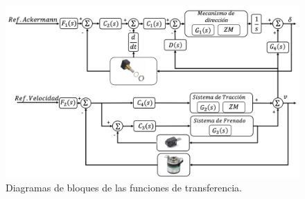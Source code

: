 \begin{figure}[!ht]
  \centering
    \includegraphics[width=1\textwidth]{Figuras/Diagrama_Bloques.PNG}
  \caption{Diagramas de bloques de las funciones de transferencia.}
  \label{fig:diagramas_bloques}
\end{figure}